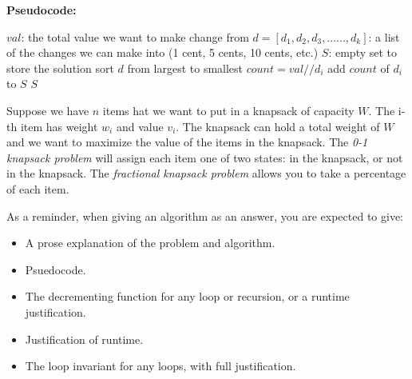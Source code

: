 \documentclass{article}
\begin{document}
\textbf{Pseudocode:}
\begin{algorithm}
\begin{algorithmic}
\State $val$: the total value we want to make change from
\State $d = [d_1, d_2, d_3, ......, d_k]$: a list of the changes we can make into (1 cent,
5 cents, 10 cents, etc.)
\State $S$: empty set to store the solution
\State sort $d$ from largest to smallest
\State $count = val // d_i$
\State add $count$ of $d_i$ to $S$  
\EndFor
\newline
\Return $S$
\EndFunction
\end{algorithmic}
\end{algorithm}


\nextprob
Suppose we have $n$ items hat we want to put in a knapsack of capacity $W$.  The i-th item has
weight $w_i$ and value $v_i$.  The knapsack can hold a total weight of $W$ and
we want to maximize the value of the items in the knapsack.
The \emph{0-1 knapsack problem} will assign each item one of two states: in the
knapsack, or not in the knapsack.  The \emph{fractional knapsack problem} allows
you to take a percentage of each item.

As a reminder, when giving an algorithm as an answer, you
are expected to give:
\begin{itemize}
\item A prose explanation of the problem and algorithm.
\item Psuedocode.
\item The decrementing function for any loop or recursion, or a runtime
justification.
\item Justification of runtime.
\item The loop invariant for any loops, with full justification.
\end{itemize}
\end{document}
